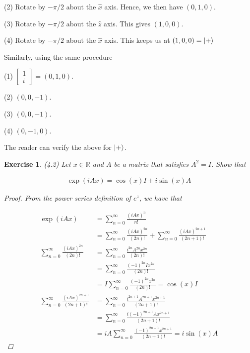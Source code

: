 \documentclass[11pt]{article}
\newcommand\0{\mathbf{0}}
\newcommand\RR{\mathbb{R}}
\newcommand\<{\langle}
\renewcommand\>{\rangle}
\newtheorem{exercise}[theorem]{Exercise}
\begin{document}
(2) Rotate by $- \pi / 2$ about the $\hat{x}$ axis. Hence, we then have $(0, 1,0)$.

(3) Rotate by $- \pi / 2$ about the $\hat{z}$ axis. This gives $(1, 0, 0)$.

(4) Rotate by $- \pi / 2$ about the $\hat{x}$ axis. This keeps us at $(1, 0, 0) = \ket{+}$

Similarly, using the same procedure

(1) $\begin{bmatrix} 1 \\ i \end{bmatrix} = (0, 1, 0)$.

(2) $(0, 0 , -1)$.

(3) $(0, 0, -1)$.

(4) $(0, -1, 0)$.

The reader can verify the above for $\ket{+}$. 

\begin{exercise} (4.2) Let $x \in \RR$ and $A$ be a matrix that satisfies $A^2 = I$. Show that 

\begin{align*}
\exp(i A x) = \cos(x) I + i \sin(x) A	
\end{align*}
 
\begin{proof}

From the power series definition of $e^{z}$, we have that
	
	\begin{align*}
		\exp(i A x) &=  \sum_{n=0}^\infty \frac{(iAx)^n}{n!} \\
		&= \sum_{n=0}^\infty \frac{(iAx)^{2n}}{(2n)!} + \sum_{n=0}^\infty \frac{(iAx)^{2n+1}}{(2n+1)!} \\
		\sum_{n=0}^\infty \frac{(iAx)^{2n}}{(2n)!} &= \sum_{n=0}^\infty \frac{i^{2n}A^{2n}x^{2n}}{(2n)!} \\
		&= \sum_{n=0}^\infty \frac{(-1)^{2n} I x^{2n}}{(2n)!} \\
		&= I \sum_{n=0}^\infty \frac{(-1)^{2n}  x^{2n}}{(2n)!} = \cos(x)I \\
		\sum_{n=0}^\infty \frac{(iAx)^{2n+1}}{(2n+1)!} &= \sum_{n=0}^\infty \frac{i^{2n+1}A^{2n+1}x^{2n+1}}{(2n+1)!} \\
		&= \sum_{n=0}^\infty \frac{i(-1)^{2n+1}Ax^{2n+1}}{(2n+1)!} \\
		&= iA \sum_{n=0}^\infty \frac{(-1)^{2n+1}x^{2n+1}}{(2n+1)!} = i\sin(x) A
	\end{align*}

\end{proof}
\end{exercise}
\end{document}

